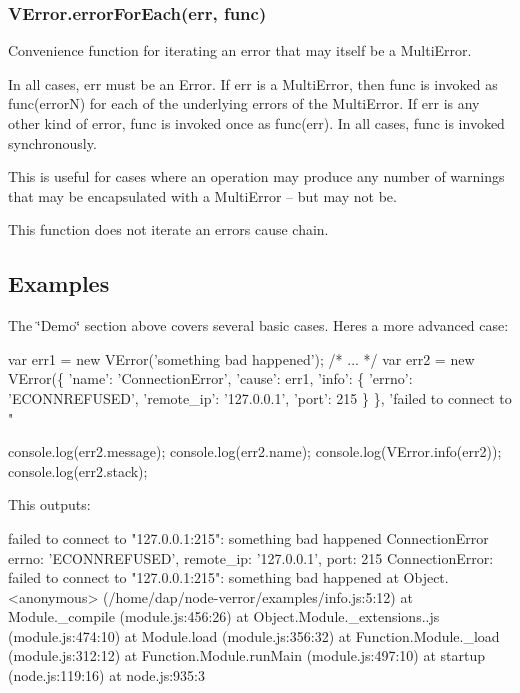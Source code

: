 \subsubsection*{{\ttfamily V\+Error.\+error\+For\+Each(err, func)}}

Convenience function for iterating an error that may itself be a Multi\+Error.

In all cases, {\ttfamily err} must be an Error. If {\ttfamily err} is a Multi\+Error, then {\ttfamily func} is invoked as {\ttfamily func(error\+N)} for each of the underlying errors of the Multi\+Error. If {\ttfamily err} is any other kind of error, {\ttfamily func} is invoked once as {\ttfamily func(err)}. In all cases, {\ttfamily func} is invoked synchronously.

This is useful for cases where an operation may produce any number of warnings that may be encapsulated with a Multi\+Error -- but may not be.

This function does not iterate an error\textquotesingle{}s cause chain.

\subsection*{Examples}

The \char`\"{}\+Demo\char`\"{} section above covers several basic cases. Here\textquotesingle{}s a more advanced case\+:


\begin{DoxyCode}
var err1 = new VError('something bad happened');
/* ... */
var err2 = new VError(\{
    'name': 'ConnectionError',
    'cause': err1,
    'info': \{
        'errno': 'ECONNREFUSED',
        'remote\_ip': '127.0.0.1',
        'port': 215
    \}
\}, 'failed to connect to "%

console.log(err2.message);
console.log(err2.name);
console.log(VError.info(err2));
console.log(err2.stack);
\end{DoxyCode}


This outputs\+: \begin{DoxyVerb}failed to connect to "127.0.0.1:215": something bad happened
ConnectionError
{ errno: 'ECONNREFUSED', remote_ip: '127.0.0.1', port: 215 }
ConnectionError: failed to connect to "127.0.0.1:215": something bad happened
    at Object.<anonymous> (/home/dap/node-verror/examples/info.js:5:12)
    at Module._compile (module.js:456:26)
    at Object.Module._extensions..js (module.js:474:10)
    at Module.load (module.js:356:32)
    at Function.Module._load (module.js:312:12)
    at Function.Module.runMain (module.js:497:10)
    at startup (node.js:119:16)
    at node.js:935:3
\end{DoxyVerb}


